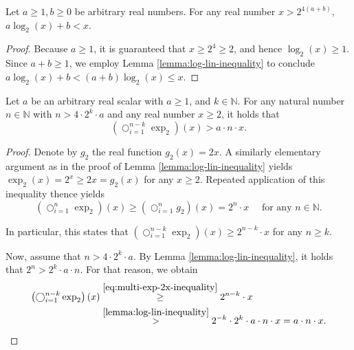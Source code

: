 \begin{corollary}
	\label{cor:log-lin-add-inequality}
	Let $a\geq 1,b\geq 0$ be arbitrary real numbers.
	For any real number $x> 2^{4(a+b)}$, $a\log_2(x)+b < x$.
\end{corollary}
\begin{proof}
	Because $a\geq 1$, it is guaranteed that $x\geq 2^4 \geq 2$, and hence $\log_2(x)\geq 1$. 
	Since $a+b\geq 1$, we employ Lemma \ref{lemma:log-lin-inequality} to conclude $a\log_2(x)+b < (a+b)\log_2(x)\leq x$.
\end{proof}

\begin{lemma}
	\label{lemma:cascade-exp-inequality}
	Let $a$ be an arbitrary real scalar with $a\geq 1$, and $k\in\mathbb{N}$. 
	For any natural number $n\in\mathbb{N}$ with $n>4\cdot 2^k\cdot a$ and any real number $x\geq 2$, it holds that
	\begin{equation}
		\left(\bigcirc_{i=1}^{n-k}\exp_2\right)(x) > a\cdot n \cdot x.
	\end{equation}
\end{lemma}
\begin{proof}
	Denote by $g_2$ the real function $g_2(x)=2x$.
	A similarly elementary argument as in the proof of Lemma \ref{lemma:log-lin-inequality} yields $\exp_2(x)=2^x\geq 2x=g_2(x)$ for any $x\geq 2$.
	Repeated application of this inequality thence yields 
	\begin{equation}
		\label{eq:multi-exp-2x-inequality}
		\left(\bigcirc_{i=1}^n\exp_2\right)(x) \geq \left(\bigcirc_{i=1}^n g_2\right)(x)= 2^n\cdot x \quad \text{ for any } n\in\mathbb{N}.
	\end{equation}
	
	In particular, this states that $\left(\bigcirc_{i=1}^{n-k}\exp_2\right)(x) \geq 2^{n-k}\cdot x$ for any $n\geq k$.
	
	Now, assume that $n>4\cdot 2^k\cdot a$.
	By Lemma \ref{lemma:log-lin-inequality}, it holds that $2^n> 2^k\cdot a\cdot n$.
	For that reason, we obtain
	\begin{align}
		\label{eq:cascade-exp-inequality}
		\left(\bigcirc_{i=1}^{n-k}\exp_2\right)(x) &\overset{\ref{eq:multi-exp-2x-inequality}}{\geq} 2^{n-k}\cdot x\\
		&\overset{\ref{lemma:log-lin-inequality}}{>} 2^{-k}\cdot 2^k\cdot a\cdot n \cdot x = a\cdot n\cdot x.
	\end{align}
	
\end{proof}
